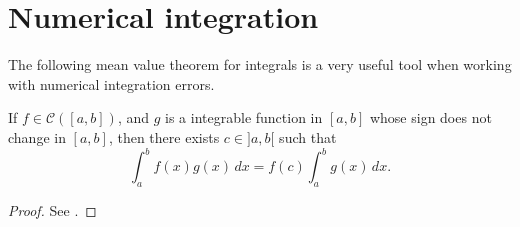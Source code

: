 \section{Numerical integration}
\label{anexo-numint}
The following mean value theorem for integrals is a very useful tool 
when working with numerical integration errors.
\begin{thrm}
	\label{anexo-numint-mv}
	If $f \in \mathcal{C}([a,b])$, and $g$ is a integrable function in $[a,b]$
	whose sign does not change in $[a,b]$,
	then there exists $c \in ]a,b[$ such that
	\begin{equation*}
		\int_{a}^{b}f(x)g(x) \,dx = f(c)\int_{a}^{b}g(x) \,dx.
	\end{equation*}
\end{thrm}
\begin{proof}
	See \citet[\pno~143]{courant:1999}.
\end{proof}

